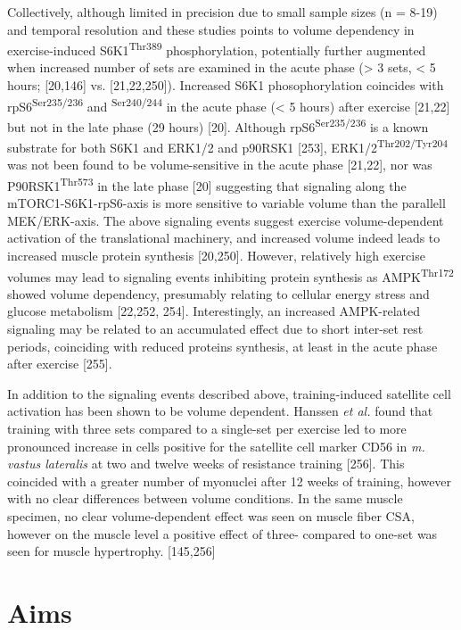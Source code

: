 \documentclass[twoside,10pt]{gihclass} %
\begin{document}
Collectively, although limited in precision due to small sample sizes (n = 8-19) and temporal resolution and
these studies points to volume dependency in exercise-induced S6K1\textsuperscript{Thr389} phosphorylation, potentially further augmented when increased number of sets are examined in the acute phase
(\textgreater{} 3 sets, \textless{} 5 hours; {[}20,146{]} vs. {[}21,22,250{]}).
Increased S6K1 phosophorylation coincides with rpS6\textsuperscript{Ser235/236} and \textsuperscript{Ser240/244} in the acute phase (\textless{} 5 hours) after exercise
{[}21,22{]} but not in the late phase (29 hours) {[}20{]}.
Although rpS6\textsuperscript{Ser235/236} is a known substrate for both S6K1 and ERK1/2 and p90RSK1
{[}253{]},
ERK1/2\textsuperscript{Thr202/Tyr204} was not been found to be volume-sensitive in the acute phase
{[}21,22{]},
nor was P90RSK1\textsuperscript{Thr573} in the late phase {[}20{]}
suggesting that signaling along the mTORC1-S6K1-rpS6-axis is more sensitive to variable volume than the parallell MEK/ERK-axis.
The above signaling events suggest exercise volume-dependent activation of the translational machinery, and increased volume indeed leads to increased muscle protein synthesis
{[}20,250{]}.
However, relatively high exercise volumes may lead to signaling events inhibiting protein synthesis as AMPK\textsuperscript{Thr172} showed volume dependency, presumably relating to cellular energy stress and glucose metabolism
{[}22,252, 254{]}.
Interestingly, an increased AMPK-related signaling may be related to an accumulated effect due to short inter-set rest periods, coinciding with reduced proteins synthesis, at least in the acute phase after exercise
{[}255{]}.

In addition to the signaling events described above, training-induced satellite cell activation has been shown to be volume dependent.
Hanssen \emph{et al.} found that training with three sets compared to a single-set per exercise led to more pronounced increase in cells positive for the satellite cell marker CD56 in \emph{m. vastus lateralis} at two and twelve weeks of resistance training {[}256{]}.
This coincided with a greater number of myonuclei after 12 weeks of training, however with no clear differences between volume conditions.
In the same muscle specimen, no clear volume-dependent effect was seen on muscle fiber CSA, however on the muscle level a positive effect of three- compared to one-set was seen for muscle hypertrophy.
{[}145,256{]}

\hypertarget{aims}{%
\chapter{Aims}\label{aims}}
\end{document}
